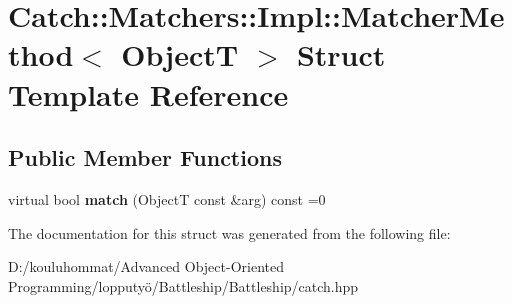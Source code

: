 \hypertarget{struct_catch_1_1_matchers_1_1_impl_1_1_matcher_method}{}\section{Catch\+:\+:Matchers\+:\+:Impl\+:\+:Matcher\+Method$<$ ObjectT $>$ Struct Template Reference}
\label{struct_catch_1_1_matchers_1_1_impl_1_1_matcher_method}
\subsection*{Public Member Functions}
\begin{DoxyCompactItemize}
\item 
\mbox{\label{struct_catch_1_1_matchers_1_1_impl_1_1_matcher_method_ae0920ff9e817acf08e1bb0cbcb044e30}} 
virtual bool {\bfseries match} (ObjectT const \&arg) const =0
\end{DoxyCompactItemize}


The documentation for this struct was generated from the following file\+:\begin{DoxyCompactItemize}
\item 
D\+:/kouluhommat/\+Advanced Object-\/\+Oriented Programming/lopputyö/\+Battleship/\+Battleship/catch.\+hpp\end{DoxyCompactItemize}

